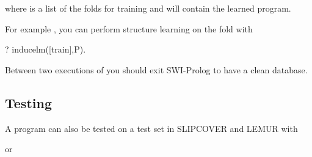 \documentclass[letterpaper,10pt,english]{sphinxmanual}
\begin{document}
\begin{sphinxVerbatim}[commandchars=\\\{\}]
  
\end{sphinxVerbatim}

where  is a list of the folds for training and  will contain the learned program.

For example , you can perform structure learning on the  fold with

\begin{sphinxVerbatim}[commandchars=\\\{\}]
?\PYGZhy{} induce\PYGZus{}lm([train],P).
\end{sphinxVerbatim}

Between two executions of  you should exit SWI-Prolog to have a clean database.


\subsection{Testing}
\label{\detokenize{index:testing}}
A program can also be tested on a test set in SLIPCOVER and LEMUR with

\begin{sphinxVerbatim}[commandchars=\\\{\}]
  
\end{sphinxVerbatim}

or

\begin{sphinxVerbatim}[commandchars=\\\{\}]
  
\end{sphinxVerbatim}
\end{document}
